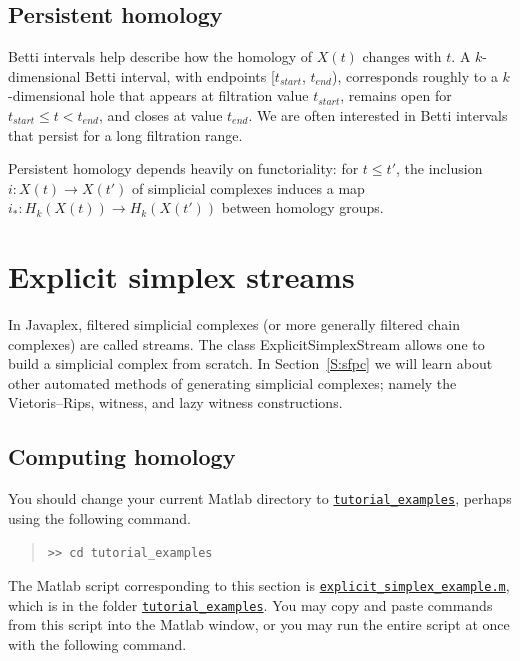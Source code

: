 \documentclass[amscd, amssymb, verbatim]{amsart}[12pt]
\theoremstyle{remark}
\theoremstyle{remark}
\theoremstyle{remark}
\begin{document}
\subsection{Persistent homology}
Betti intervals help describe how the homology of $X(t)$ changes with $t$. A $k$-dimensional Betti interval, with endpoints [$t_{start}$, $t_{end}$), corresponds roughly to a $k$-dimensional hole that appears at filtration value $t_{start}$, remains open for $t_{start} \leq t < t_{end}$, and closes at value $t_{end}$. We are often interested in Betti intervals that persist for a long filtration range. 

Persistent homology depends heavily on functoriality: for $t\leq t'$, the inclusion $i:X(t)\to X(t')$ of simplicial complexes induces a map $i_*:H_k(X(t))\to H_k(X(t'))$ between homology groups. 




\section{Explicit simplex streams}\label{S:explicitStream}

In Javaplex, filtered simplicial complexes (or more generally filtered chain complexes) are called streams. The class ExplicitSimplexStream allows one to build a simplicial complex from scratch. In Section~\ref{S:sfpc} we will learn about other automated methods of generating simplicial complexes; namely the Vietoris--Rips, witness, and lazy witness constructions. 


\subsection{Computing homology}

You should change your current Matlab directory to \href{https://github.com/appliedtopology/javaplex/tree/master/src/matlab/for_distribution/tutorial_examples}{\texttt{tutorial\_examples}}, perhaps using the following command.

\begin{quote} \begin{verbatim} 
>> cd tutorial_examples
\end{verbatim} \end{quote}

The Matlab script corresponding to this section is \href{https://github.com/appliedtopology/javaplex/tree/master/src/matlab/for_distribution/tutorial_examples/explicit_simplex_example.m}{\texttt{explicit\_simplex\_example.m}}, which is in the folder \href{https://github.com/appliedtopology/javaplex/tree/master/src/matlab/for_distribution/tutorial_examples}{\texttt{tutorial\_examples}}. You may copy and paste commands from this script into the Matlab window, or you may run the entire script at once with the following command.
\end{document}
